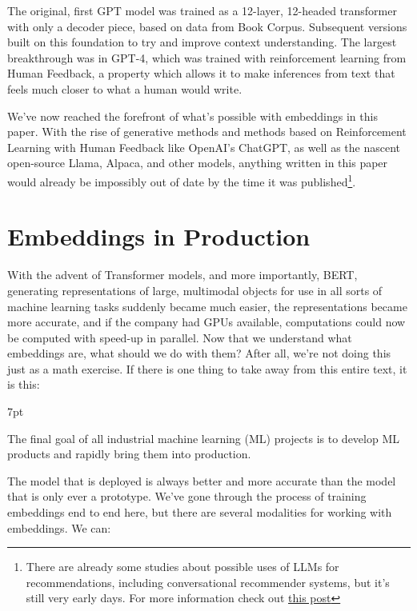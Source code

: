 \documentclass[11pt, table]{diazessay} %
\newenvironment{formal}{%
  \def\FrameCommand{%
	\hspace{1pt}%
	{\color{w_lightblue}\vrule width 2pt}%
	{\color{formalshade}\vrule width 4pt}%
	\colorbox{formalshade}%
  }%
  \MakeFramed{\advance\hsize-\width\FrameRestore}%
  \noindent\hspace{-4.55pt}%
  \begin{adjustwidth}{}{7pt}%
  \vspace{2pt}\vspace{2pt}%
}
{%
  \vspace{2pt}\end{adjustwidth}\endMakeFramed%
}
\begin{document}
\begin{sloppypar}
The original, first GPT model was trained as a 12-layer, 12-headed transformer with only a decoder piece, based on data from Book Corpus. Subsequent versions built on this foundation to try and improve context understanding. The largest breakthrough was in GPT-4, which was trained with reinforcement learning from Human Feedback, a property which allows it to make inferences from text that feels much closer to what a human would write.

We've now reached the forefront of what's possible with embeddings in this paper. With the rise of generative methods and methods based on Reinforcement Learning with Human Feedback like OpenAI's ChatGPT, as well as the nascent open-source Llama, Alpaca, and other models,  anything written in this paper would already be impossibly out of date by the time it was published\footnote{There are already some studies about possible uses of LLMs for recommendations, including conversational recommender systems, but it's still very early days. For more information check out \href{https://blog.reachsumit.com/posts/2023/05/tuning-llm-for-recsys/}{this post}}.

\section{Embeddings in Production}

With the advent of Transformer models, and more importantly, BERT, generating representations of large, multimodal objects for use in all sorts of machine learning tasks suddenly became much easier, the representations became more accurate, and if the company had GPUs available, computations could now be computed with speed-up in parallel. Now that we understand what embeddings are, what should we do with them? After all, we're not doing this just as a math exercise. If there is one thing to take away from this entire text, it is this:

\begin{formal}
The final goal of all industrial machine learning (ML) projects is to develop ML products and rapidly bring them into production. \citep{kreuzberger2022machine}
\end{formal}

The model that is deployed is always better and more accurate than the model that is only ever a prototype. We've gone through the process of training embeddings end to end here, but there are several modalities for working with embeddings. We can:


\end{sloppypar}
\end{document}
